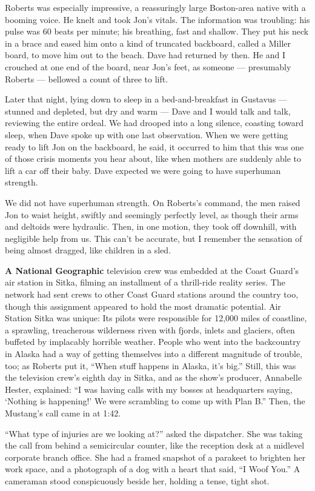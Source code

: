 Roberts was especially impressive, a reassuringly large Boston-area
native with a booming voice. He knelt and took Jon's vitals. The
information was troubling: his pulse was 60 beats per minute; his
breathing, fast and shallow. They put his neck in a brace and eased him
onto a kind of truncated backboard, called a Miller board, to move him
out to the beach. Dave had returned by then. He and I crouched at one
end of the board, near Jon's feet, as someone --- presumably Roberts ---
bellowed a count of three to lift.

Later that night, lying down to sleep in a bed-and-breakfast in Gustavus
--- stunned and depleted, but dry and warm --- Dave and I would talk and
talk, reviewing the entire ordeal. We had drooped into a long silence,
coasting toward sleep, when Dave spoke up with one last observation.
When we were getting ready to lift Jon on the backboard, he said, it
occurred to him that this was one of those crisis moments you hear
about, like when mothers are suddenly able to lift a car off their baby.
Dave expected we were going to have superhuman strength.

We did not have superhuman strength. On Roberts's command, the men
raised Jon to waist height, swiftly and seemingly perfectly level, as
though their arms and deltoids were hydraulic. Then, in one motion, they
took off downhill, with negligible help from us. This can't be accurate,
but I remember the sensation of being almost dragged, like children in a
sled.

\textbf{A National Geographic} television crew was embedded at the Coast
Guard's air station in Sitka, filming an installment of a thrill-ride
reality series. The network had sent crews to other Coast Guard stations
around the country too, though this assignment appeared to hold the most
dramatic potential. Air Station Sitka was unique: Its pilots were
responsible for 12,000 miles of coastline, a sprawling, treacherous
wilderness riven with fjords, inlets and glaciers, often buffeted by
implacably horrible weather. People who went into the backcountry in
Alaska had a way of getting themselves into a different magnitude of
trouble, too; as Roberts put it, ``When stuff happens in Alaska, it's
big.'' Still, this was the television crew's eighth day in Sitka, and as
the show's producer, Annabelle Hester, explained: ``I was having calls
with my bosses at headquarters saying, `Nothing is happening!' We were
scrambling to come up with Plan B.'' Then, the Mustang's call came in at
1:42.

``What type of injuries are we looking at?'' asked the dispatcher. She
was taking the call from behind a semicircular counter, like the
reception desk at a midlevel corporate branch office. She had a framed
snapshot of a parakeet to brighten her work space, and a photograph of a
dog with a heart that said, ``I Woof You.'' A cameraman stood
conspicuously beside her, holding a tense, tight shot.

